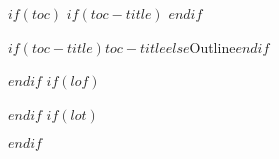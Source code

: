 
$if(toc)$
$if(toc-title)$
\renewcommand*\contentsname{$toc-title$}
$endif$
\begin{frame}{$if(toc-title)$$toc-title$$else$Outline$endif$}
  \vspace*{0.7cm}
  \tableofcontents[hideallsubsections]
\end{frame}
$endif$
$if(lof)$
\listoffigures
$endif$
$if(lot)$
\listoftables
$endif$
